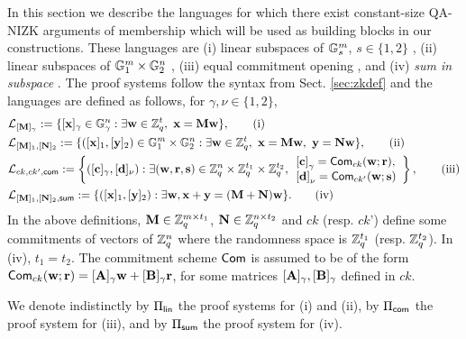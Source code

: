 In this section we describe the languages for which there exist constant-size QA-NIZK arguments of membership which will be used as building blocks in our constructions.  These languages are (i) linear subspaces of $\mathbb{G}_s^m$, $s \in \{1,2\}$ \cite{C:JutRoy14,EC:KilWee15,EC:LPJY14}, (ii) linear subspaces of $\mathbb{G}_1^m\times\mathbb{G}_2^n$ \cite{AC:GonHevRaf15}, (iii) equal commitment opening \cite{AC:GonHevRaf15}, and (iv) \emph{sum in subspace} \cite{AC:GonHevRaf15}. The proof systems follow the syntax from Sect. \ref{sec:zkdef} and the languages are defined as follows, for $\gamma,\nu \in \{1,2\}$, 
\begin{align}
&\mathcal{L}_{[\mathbf{{M}}]_\gamma}:=\{ [\mathbf{x}]_{\gamma} \in \mathbb{G}_{\gamma}^{n}:  \exists \mathbf{w} \in \mathbb{Z}_q^{t}, \  \mathbf{x}=\mathbf{{M}}\mathbf{w} \}, \tag{i}\\
&\mathcal{L}_{[\mathbf{{M}}]_1,[\mathbf{{N}}]_2}:=\{ ([\mathbf{x}]_1,[\mathbf{y}]_2) \in \mathbb{G}_1^{m}\times\mathbb{G}_2^n:  \exists \mathbf{w} \in \mathbb{Z}_q^{t}, \  \mathbf{x}=\mathbf{{M}}\mathbf{w}, \   \mathbf{y}=\mathbf{{N}}\mathbf{w} \}, \tag{ii}\\
&\mathcal{L}_{ck,ck',\mathsf{com}}:=\left\{([\mathbf{c}]_\gamma,[\mathbf{d}]_\nu):\exists (\mathbf{w}, \mathbf{r},\mathbf{s}) 
\in \mathbb{Z}_q^n \times \mathbb{Z}_q^{t_1} \times \mathbb{Z}_q^{t_2},  
\begin{array}{l}
    {[\mathbf{c}]}_\gamma=\mathsf{Com}_{ck}(\mathbf{w};\mathbf{r}),\\
    {[\mathbf{d}]}_\nu=\mathsf{Com}_{ck'}(\mathbf{w};\mathbf{s})
\end{array}
\right\}, \tag{iii}\\
&\mathcal{L}_{[\mathbf{{M}}]_1,[\mathbf{{N}}]_2,\mathsf{sum}}:=\{([\mathbf{x}]_1,[\mathbf{y}]_2):\exists\mathbf{w}, \mathbf{x}+\mathbf{y}=(\mathbf{{M}}+\mathbf{{N}})\mathbf{w}\}. \tag{iv}
\end{align}
In the above definitions, $\mathbf{{M}} \in \mathbb{Z}_q^{m \times t_1}$,
  $\mathbf{{N}} \in \mathbb{Z}_q^{n \times t_2}$ and $ck$ (resp. $ck$') define some commitments of vectors of $\mathbb{Z}_q^{n}$ where the randomness space is $\mathbb{Z}_q^{t_1}$ (resp. $\mathbb{Z}_q^{t_2}$). In (iv), $t_1=t_2$. The commitment scheme $\mathsf{Com}$ is assumed to be of the form 
 $\mathsf{Com}_{ck}(\mathbf{w};\mathbf{r})=[\mathbf{{A}}]_\gamma \mathbf{w}+[\mathbf{{B}}]_\gamma \mathbf{r}$, 
 for some matrices $[\mathbf{{A}}]_\gamma,[\mathbf{{B}}]_\gamma$ defined in 
  $ck$. 

We denote indistinctly by $\Pi_{\mathsf{lin}}$ the proof systems for (i) and (ii), by $\Pi_{\mathsf{com}}$ the proof system for (iii), and by $\Pi_{\mathsf{sum}}$ the proof system for (iv).

